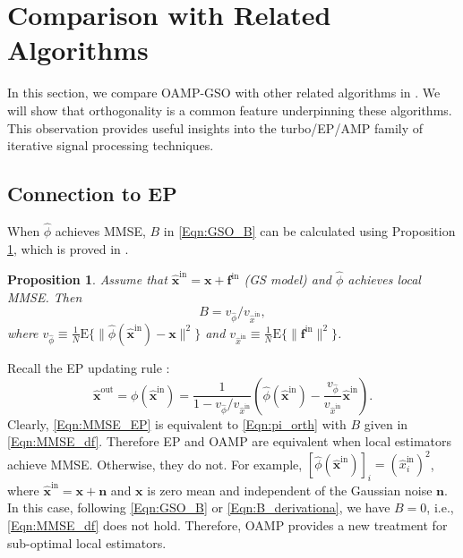 \documentclass[journal]{IEEEtran}
\newcommand{\mr}{\mathrm}
\newcommand{\BE}{\begin{equation}}
\newcommand{\EE}{\end{equation}}
\renewcommand{\bf}{\bm}
\newtheorem{proposition}[theorem]{Proposition}
\begin{document}
\section{Comparison with Related Algorithms}\label{Sec:comp_algs}
In this section, we compare OAMP-GSO with other related algorithms in \cite{Cakmak2018, Minka2001, Donoho2009, Rangan2016, Ma2016}. We will show that orthogonality is a common feature underpinning these algorithms. This observation provides useful insights into the turbo/EP/AMP family of iterative signal processing techniques. 


\subsection{Connection to EP}\label{Sec:EP}
When $\hat{\phi} $ achieves MMSE, $B$ in \eqref{Eqn:GSO_B} can be calculated using Proposition \ref{Pro:EP}, which is proved in \cite[Appendix B]{Yiyao_mmv}.

\begin{proposition}\label{Pro:EP}
Assume that $\hat{\bf{x}}^{\mr{in}}=\bf{x}+{\bf{f}}^{\mr{in}}$ (GS model) and $\hat{\phi} $ achieves local MMSE. Then 
\BE\label{Eqn:MMSE_df}
B  = v_{\hat{\phi}}/v_{\hat{x}^{\mr{in}}},
\EE
where $v_{\hat{\phi}}\!\equiv \!\tfrac{1}{N}\mr{E}\{\| \hat{\phi}(\hat{\bf{x}}^{\mr{in}}) \!-\! \bf{x}\|^2\}$ and $v_{\hat{x}^{\mr{in}}}\!\equiv\!\tfrac{1}{N} \mr{E}\{\|{\bf{f}}^{\mr{in}}\|^2\}$.
\end{proposition}
 

Recall the EP updating rule \cite{Cakmak2018, Minka2001}:
\BE\label{Eqn:MMSE_EP}
	\hat{\bf{x}}^{\mr{out}} ={ {\phi}}(\hat{\bf{x}}^{\mr{in}}) =\frac{1}{1-v_{\hat{\phi}}/v_{\hat{x}^{\mr{in}}}} \left( \hat{ {\phi}}(\hat{\bf{x}}^{\mr{in}}) -\frac{v_{\hat{\phi}}}{v_{\hat{x}^{\mr{in}}}}\hat{\bf{x}}^{\mr{in}}\right).
\EE
Clearly,  \eqref{Eqn:MMSE_EP} is equivalent to \eqref{Eqn:pi_orth} with $B$ given in \eqref{Eqn:MMSE_df}. Therefore EP and OAMP are equivalent when local estimators achieve MMSE. Otherwise, they do not. For example, $[\hat{ {\phi}}(\hat{\bf{x}}^{\mr{in}})]_i = (\hat{x}_i^{\mr{in}})^2$, where $\hat{\bf{x}}^{\mr{in}}={\bf{x}}+\bf{n}$ and  $\bf{x}$ is zero mean and  independent of the Gaussian noise $\bf{n}$. In this case, following  \eqref{Eqn:GSO_B} or \eqref{Eqn:B_derivationa}, we have $B=0$, i.e., \eqref{Eqn:MMSE_df} does not hold. Therefore, OAMP provides a new treatment for sub-optimal local estimators.
 
\end{document}
